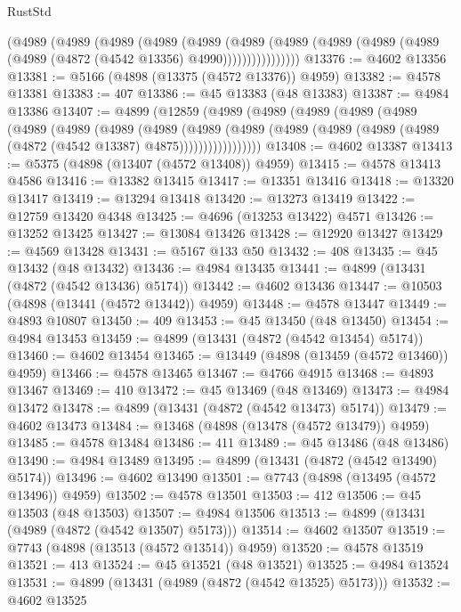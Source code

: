 \begin{lexlean}{RustStd}
\begin{coremodule}
            (@4989
              (@4989
                (@4989
                  (@4989
                    (@4989
                      (@4989
                        (@4989
                          (@4989 (@4989 (@4989 (@4989 (@4872 (@4542 @13356) @4990))))))))))))))))
@13376 := @4602 @13356
@13381 := @5166 (@4898 (@13375 (@4572 @13376)) @4959)
@13382 := @4578 @13381
@13383 := 407
@13386 := @45 @13383 (@48 @13383)
@13387 := @4984 @13386
@13407 := @4899
    (@12859
      (@4989
        (@4989
          (@4989
            (@4989
              (@4989
                (@4989
                  (@4989
                    (@4989
                      (@4989
                        (@4989
                          (@4989
                            (@4989 (@4989 (@4989 (@4989 (@4872 (@4542 @13387) @4875)))))))))))))))))
@13408 := @4602 @13387
@13413 := @5375 (@4898 (@13407 (@4572 @13408)) @4959)
@13415 := @4578 @13413 @4586
@13416 := @13382 @13415
@13417 := @13351 @13416
@13418 := @13320 @13417
@13419 := @13294 @13418
@13420 := @13273 @13419
@13422 := @12759 @13420 @4348
@13425 := @4696 (@13253 @13422) @4571
@13426 := @13252 @13425
@13427 := @13084 @13426
@13428 := @12920 @13427
@13429 := @4569 @13428
@13431 := @5167 @133 @50
@13432 := 408
@13435 := @45 @13432 (@48 @13432)
@13436 := @4984 @13435
@13441 := @4899 (@13431 (@4872 (@4542 @13436) @5174))
@13442 := @4602 @13436
@13447 := @10503 (@4898 (@13441 (@4572 @13442)) @4959)
@13448 := @4578 @13447
@13449 := @4893 @10807
@13450 := 409
@13453 := @45 @13450 (@48 @13450)
@13454 := @4984 @13453
@13459 := @4899 (@13431 (@4872 (@4542 @13454) @5174))
@13460 := @4602 @13454
@13465 := @13449 (@4898 (@13459 (@4572 @13460)) @4959)
@13466 := @4578 @13465
@13467 := @4766 @4915
@13468 := @4893 @13467
@13469 := 410
@13472 := @45 @13469 (@48 @13469)
@13473 := @4984 @13472
@13478 := @4899 (@13431 (@4872 (@4542 @13473) @5174))
@13479 := @4602 @13473
@13484 := @13468 (@4898 (@13478 (@4572 @13479)) @4959)
@13485 := @4578 @13484
@13486 := 411
@13489 := @45 @13486 (@48 @13486)
@13490 := @4984 @13489
@13495 := @4899 (@13431 (@4872 (@4542 @13490) @5174))
@13496 := @4602 @13490
@13501 := @7743 (@4898 (@13495 (@4572 @13496)) @4959)
@13502 := @4578 @13501
@13503 := 412
@13506 := @45 @13503 (@48 @13503)
@13507 := @4984 @13506
@13513 := @4899 (@13431 (@4989 (@4872 (@4542 @13507) @5173)))
@13514 := @4602 @13507
@13519 := @7743 (@4898 (@13513 (@4572 @13514)) @4959)
@13520 := @4578 @13519
@13521 := 413
@13524 := @45 @13521 (@48 @13521)
@13525 := @4984 @13524
@13531 := @4899 (@13431 (@4989 (@4872 (@4542 @13525) @5173)))
@13532 := @4602 @13525

\end{coremodule}
\end{lexlean}
